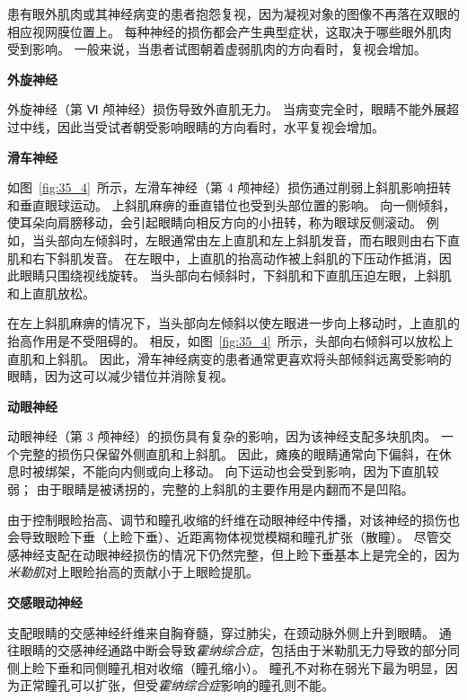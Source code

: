 \begin{proposition}[眼外肌肉或神经损伤] \label{box:35_1}

\quad \quad 患有眼外肌肉或其神经病变的患者抱怨复视，因为凝视对象的图像不再落在双眼的相应视网膜位置上。
每种神经的损伤都会产生典型症状，这取决于哪些眼外肌肉受到影响。
一般来说，当患者试图朝着虚弱肌肉的方向看时，复视会增加。


\textbf{外旋神经}

\quad \quad 外旋神经（第 Ⅵ 颅神经）损伤导致外直肌无力。
当病变完全时，眼睛不能外展超过中线，因此当受试者朝受影响眼睛的方向看时，水平复视会增加。


\textbf{滑车神经}

\quad \quad 如图~\ref{fig:35_4}~所示，左滑车神经（第 4 颅神经）损伤通过削弱上斜肌影响扭转和垂直眼球运动。
上斜肌麻痹的垂直错位也受到头部位置的影响。
向一侧倾斜，使耳朵向肩膀移动，会引起眼睛向相反方向的小扭转，称为眼球反侧滚动。
例如，当头部向左倾斜时，左眼通常由左上直肌和左上斜肌发音，而右眼则由右下直肌和右下斜肌发音。
在左眼中，上直肌的抬高动作被上斜肌的下压动作抵消，因此眼睛只围绕视线旋转。
当头部向右倾斜时，下斜肌和下直肌压迫左眼，上斜肌和上直肌放松。


\quad \quad 在左上斜肌麻痹的情况下，当头部向左倾斜以使左眼进一步向上移动时，上直肌的抬高作用是不受阻碍的。
相反，如图~\ref{fig:35_4}~所示，头部向右倾斜可以放松上直肌和上斜肌。
因此，滑车神经病变的患者通常更喜欢将头部倾斜远离受影响的眼睛，因为这可以减少错位并消除复视。


\textbf{动眼神经}

\quad \quad 动眼神经（第 3 颅神经）的损伤具有复杂的影响，因为该神经支配多块肌肉。
一个完整的损伤只保留外侧直肌和上斜肌。
因此，瘫痪的眼睛通常向下偏斜，在休息时被绑架，不能向内侧或向上移动。
向下运动也会受到影响，因为下直肌较弱；
由于眼睛是被诱拐的，完整的上斜肌的主要作用是内翻而不是凹陷。


\quad \quad 由于控制眼睑抬高、调节和瞳孔收缩的纤维在动眼神经中传播，对该神经的损伤也会导致眼睑下垂（上睑下垂）、近距离物体视觉模糊和瞳孔扩张（散瞳）。
尽管交感神经支配在动眼神经损伤的情况下仍然完整，但上睑下垂基本上是完全的，因为\textit{米勒肌}对上眼睑抬高的贡献小于上眼睑提肌。


\textbf{交感眼动神经}

\quad \quad 支配眼睛的交感神经纤维来自胸脊髓，穿过肺尖，在颈动脉外侧上升到眼睛。
通往眼睛的交感神经通路中断会导致\textit{霍纳综合症}，包括由于米勒肌无力导致的部分同侧上睑下垂和同侧瞳孔相对收缩（瞳孔缩小）。
瞳孔不对称在弱光下最为明显，因为正常瞳孔可以扩张，但受\textit{霍纳综合症}影响的瞳孔则不能。
	
\end{proposition}


